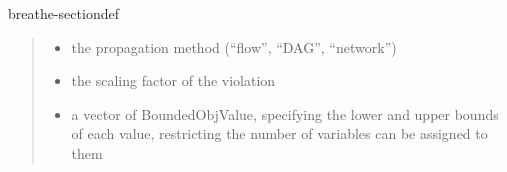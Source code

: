 \documentclass[letterpaper,10pt,openany,oneside,english]{sphinxmanual}
\begin{document}
\begin{fulllineitems}
\begin{sphinxuseclass}{breathe-sectiondef}
\begin{fulllineitems}
\begin{quote}
\begin{description}
\begin{itemize}
\item {} 
\sphinxAtStartPar
{} \textendash{} the propagation method (“flow”, “DAG”, “network”) 

\item {} 
\sphinxAtStartPar
{} \textendash{} the scaling factor of the violation 

\item {} 
\sphinxAtStartPar
{} \textendash{} a vector of BoundedObjValue, specifying the lower and upper bounds of each value, restricting the number of variables can be assigned to them 

\end{itemize}

\end{description}\end{quote}

\end{fulllineitems}


\begin{fulllineitems}
\label{\detokenize{ref/ref_cpp:_CPPv4N11WeightedCSP8postWGccEPii6string4CostP5ValueiPiPi}}\label{\detokenize{ref/ref_cpp:_CPPv3N11WeightedCSP8postWGccEPii6string4CostP5ValueiPiPi}}\label{\detokenize{ref/ref_cpp:_CPPv2N11WeightedCSP8postWGccEPii6string4CostP5ValueiPiPi}}\label{\detokenize{ref/ref_cpp:WeightedCSP::postWGcc__iP.i.string.Cost.ValueP.i.iP.iP}}
\pysigstartsignatures
\pysigstartmultiline
{}
\pysigstopmultiline
\pysigstopsignatures
\end{fulllineitems}


\end{sphinxuseclass}
\end{fulllineitems}
\end{document}
